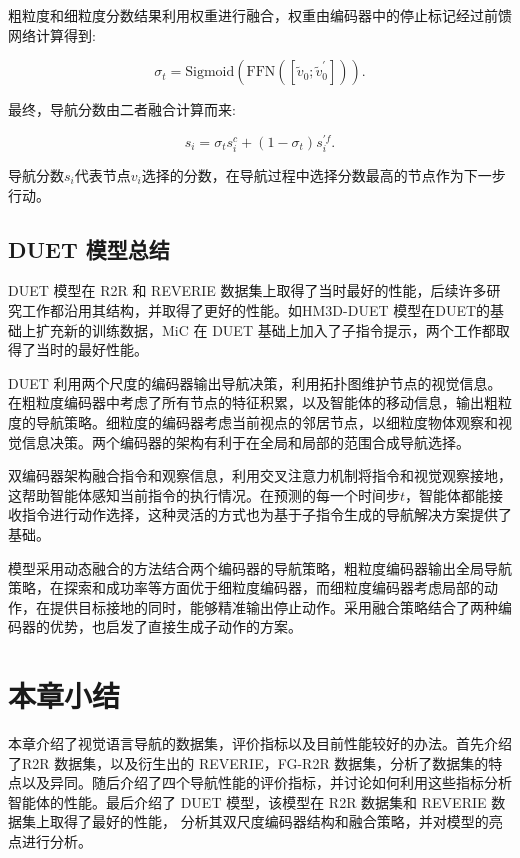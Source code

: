 \documentclass[bachelor]{thesis-uestc}
\begin{document}
粗粒度和细粒度分数结果利用权重进行融合，权重由编码器中的停止标记经过前馈网络计算得到:

\begin{equation}
    \sigma_t = \text{Sigmoid}(\text{FFN}([\tilde{v}_0; \tilde{v}^{\prime}_0])).
\label{ffn}
\end{equation}

最终，导航分数由二者融合计算而来:

\begin{equation}
    s_i = \sigma_t s^c_i + (1 - \sigma_t) s^{\prime f}_i.
\label{sce}
\end{equation}

导航分数$s_i$代表节点$v_i$选择的分数，在导航过程中选择分数最高的节点作为下一步行动。

\subsection{DUET 模型总结}
DUET 模型在 R2R 和 REVERIE 数据集上取得了当时最好的性能，后续许多研究工作都沿用其结构，并取得了更好的性能。如HM3D-DUET \cite{chenLearningUnlabeled3D2022}模型在DUET的基础上扩充新的训练数据，MiC 在 DUET 基础上加入了子指令提示，两个工作都取得了当时的最好性能。

DUET 利用两个尺度的编码器输出导航决策，利用拓扑图维护节点的视觉信息。在粗粒度编码器中考虑了所有节点的特征积累，以及智能体的移动信息，输出粗粒度的导航策略。细粒度的编码器考虑当前视点的邻居节点，以细粒度物体观察和视觉信息决策。两个编码器的架构有利于在全局和局部的范围合成导航选择。

双编码器架构融合指令和观察信息，利用交叉注意力机制将指令和视觉观察接地，这帮助智能体感知当前指令的执行情况。在预测的每一个时间步$t$，智能体都能接收指令进行动作选择，这种灵活的方式也为基于子指令生成的导航解决方案提供了基础。

模型采用动态融合的方法结合两个编码器的导航策略，粗粒度编码器输出全局导航策略，在探索和成功率等方面优于细粒度编码器，而细粒度编码器考虑局部的动作，在提供目标接地的同时，能够精准输出停止动作。采用融合策略结合了两种编码器的优势，也启发了直接生成子动作的方案。

\section{本章小结}

本章介绍了视觉语言导航的数据集，评价指标以及目前性能较好的办法。首先介绍了R2R 数据集，以及衍生出的 REVERIE，FG-R2R 数据集，分析了数据集的特点以及异同。随后介绍了四个导航性能的评价指标，并讨论如何利用这些指标分析智能体的性能。最后介绍了 DUET 模型，该模型在 R2R 数据集和 REVERIE 数据集上取得了最好的性能， 分析其双尺度编码器结构和融合策略，并对模型的亮点进行分析。
\end{document}
